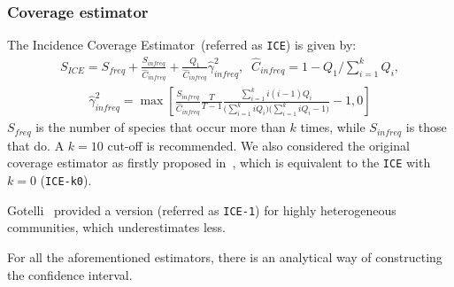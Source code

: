 \documentclass[sigconf,review,anonymous]{acmart}
\newcommand{\ICEallrare}{ICE-k0\xspace}
\newcounter{todocounter}
\newcommand{\todo}[1]{\marginpar{$|$}\textcolor{red}{\stepcounter{todocounter}\footnote[\thetodocounter]{\textcolor{red}{\textbf{TODO }}\textit{#1}}}}
\def\<#1>{\texttt{#1}}
\renewcommand{\todo}[1]{}
\begin{document}
\subsubsection{Coverage estimator~\cite{chao1992estimating}} %
The Incidence Coverage Estimator~(referred as \<ICE>) %
is given by:
\begin{gather*}
  S_{\textit{ICE}} = S_{\textit{freq}} + \frac{S_{\textit{infreq}}}{\hat{C}_{\textit{infreq}}}
  + \frac{Q_1}{\hat{C}_{\textit{infreq}}}\hat{\gamma}^2_{\textit{infreq}},\;\; \hat{C}_{\textit{infreq}}=1-Q_{1}/\sum_{i=1}^{k}Q_{i},
\end{gather*}
\begin{gather*}
  \hat{\gamma}_{\textit{infreq}}^2 = \max\left[\frac{S_{\textit{infreq}}}{\hat{C}_{\textit{infreq}}}\frac{T}{T-1}
  \frac{\sum_{i=1}^{k} i(i-1)Q_i}{
    \big(\sum_{i=1}^{k} iQ_i\big) \big(\sum_{i=1}^{k} iQ_i-1\big)
  } -1,0
  \right]
\end{gather*}
$S_{\textit{freq}}$ is the number of species that occur more than $k$ times, %
while $S_{\textit{infreq}}$ is those that do. %
A $k=10$ cut-off is recommended. We also considered the original coverage estimator
as firstly proposed in~\cite{lee1994estimating}, which is equivalent to the
\<ICE> with $k=0$ (\<\ICEallrare>).

Gotelli~\cite{gotelli2013measuring} provided a version (referred as \<ICE-1>) for highly heterogeneous communities,
which underestimates less. %


For all the aforementioned estimators, there is an analytical way of constructing the confidence interval.



\end{document}
